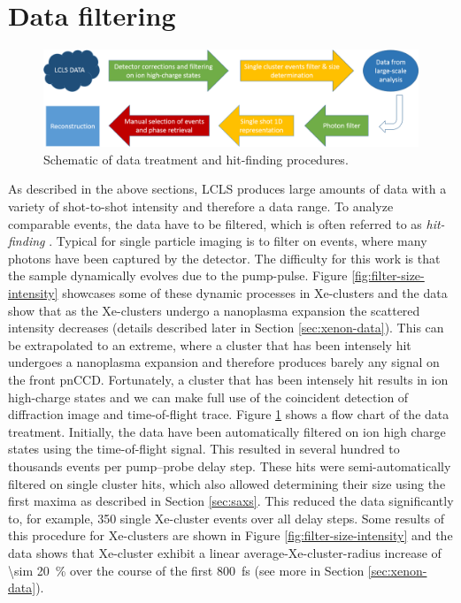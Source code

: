 \section{Data filtering}\label{sec:hitfinding}
\begin{figure}
	\centering
		\includegraphics[width=1.00\textwidth]{images/data-flow-chart.png}
	\caption{Schematic of data treatment and hit-finding procedures.}
	\label{fig:data-flow-chart}
\end{figure}
As described in the above sections, LCLS produces large amounts of data with a variety of shot-to-shot intensity and therefore a data range. To analyze comparable events, the data have to be filtered, which is often referred to as \textit{hit-finding} \cite{Gorkhover-2012-PRL,Daurer-2016-JAC,Foucar-2016-JAC}. Typical for single particle imaging is to filter on events, where many photons have been captured by the detector. The difficulty for this work is that the sample dynamically evolves due to the pump-pulse. Figure \ref{fig:filter-size-intensity} showcases some of these dynamic processes in Xe-clusters and the data show that as the Xe-clusters undergo a nanoplasma expansion the scattered intensity decreases (details described later in Section \ref{sec:xenon-data}). This can be extrapolated to an extreme, where a cluster that has been intensely hit undergoes a nanoplasma expansion and therefore produces barely any signal on the front pnCCD. Fortunately, a cluster that has been intensely hit results in ion high-charge states and we can make full use of the coincident detection of diffraction image and time-of-flight trace. Figure \ref{fig:data-flow-chart} shows a flow chart of the data treatment. Initially, the data have been automatically filtered on ion high charge states using the time-of-flight signal. This resulted in several hundred to thousands events per pump--probe delay step. These hits were semi-automatically filtered on single cluster hits, which also allowed determining their size using the first maxima as described in Section \ref{sec:saxs}. This reduced the data significantly to, for example, 350 single Xe-cluster events over all delay steps. Some results of this procedure for Xe-clusters are shown in Figure \ref{fig:filter-size-intensity} and the data shows that Xe-cluster exhibit a linear average-Xe-cluster-radius increase of \SI{\sim 20}{\percent} over the course of the first \SI{800}{\femto\second} (see more in Section \ref{sec:xenon-data}).\\[1\baselineskip]

